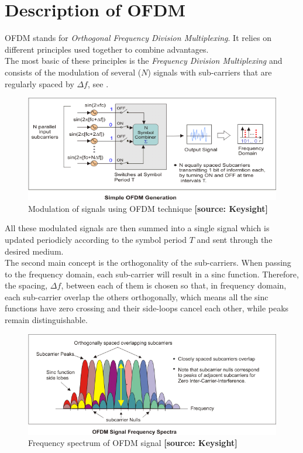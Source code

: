\section{Description of OFDM} 
OFDM stands for \textit{Orthogonal Frequency Division Multiplexing}. It relies on different principles used together to combine advantages.\\
%
\indent The most basic of these principles is the \textit{Frequency Division Multiplexing} and consists of the modulation of several ($N$) signals with sub-carriers that are regularly spaced by $\Delta f$, see .
%
\begin{figure}[H]
  \centering
  \includegraphics[width=\textwidth]{figures/ofdm-simplegenerator.png}
  \caption{Modulation of signals using OFDM technique \textbf{[source: Keysight]}}
  \label{fig:OFDMGenerator}
\end{figure}
All these modulated signals are then summed into a single signal which is updated periodicly according to the symbol period $T$ and sent through the desired medium.\\
%
\indent The second main concept is the orthogonality of the sub-carriers. When passing to the frequency domain, each sub-carrier will result in a sinc function. Therefore, the spacing, $\Delta f$, between each of them is chosen so that, in frequency domain, each sub-carrier overlap the others orthogonally, which means all the sinc functions have zero crossing and their side-loops cancel each other, while peaks remain distinguishable.
%
\begin{figure}[H]
  \centering
  \includegraphics[width=\textwidth]{figures/ofdm-orthogonalspacedsubcarriers.png}
  \caption{Frequency spectrum of OFDM signal \textbf{[source: Keysight]}}
  \label{fig:freqOrthoSinc}
\end{figure}

